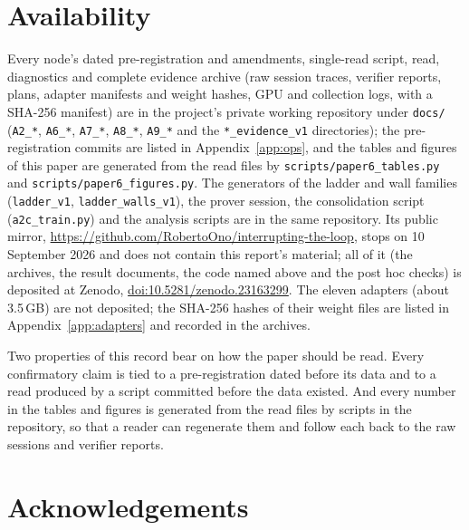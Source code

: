 \documentclass[11pt]{article}
\newcommand{\evidencedoi}{10.5281/zenodo.23163299}%
\begin{document}
\section{Availability}
\label{sec:availability}

Every node's dated pre-registration and amendments, single-read script,
read, diagnostics and complete evidence archive (raw session traces,
verifier reports, plans, adapter manifests and weight hashes, GPU and
collection logs, with a SHA-256 manifest) are in the project's private working repository
under \texttt{docs/} (\texttt{A2\_*}, \texttt{A6\_*}, \texttt{A7\_*},
\texttt{A8\_*}, \texttt{A9\_*} and the \texttt{*\_evidence\_v1}
directories); the pre-registration commits are listed in
Appendix~\ref{app:ops}, and the tables and figures of this paper are
generated from the read files by \texttt{scripts/paper6\_tables.py} and
\texttt{scripts/paper6\_figures.py}. The generators of the ladder and wall
families (\texttt{ladder\_v1}, \texttt{ladder\_walls\_v1}), the prover
session, the consolidation script (\texttt{a2c\_train.py}) and the analysis
scripts are in the same repository. Its public mirror,
\url{https://github.com/RobertoOno/interrupting-the-loop}, stops on 10 September
2026 and does not contain this report's material; all of it (the archives, the
result documents, the code named above and the post hoc checks) is deposited at
Zenodo, \href{https://doi.org/\evidencedoi}{doi:\evidencedoi}. The eleven adapters
(about 3.5\,GB) are not deposited; the SHA-256 hashes of their weight
files are listed in Appendix~\ref{app:adapters} and recorded in the
archives.

Two properties of this record bear on how the paper should be read. Every
confirmatory claim is tied to a pre-registration dated before its data and
to a read produced by a script committed before the data existed. And
every number in the tables and figures is generated from the read files
by scripts in the repository, so that a reader can regenerate them and
follow each back to the raw sessions and verifier reports.

\section*{Acknowledgements}
\end{document}
